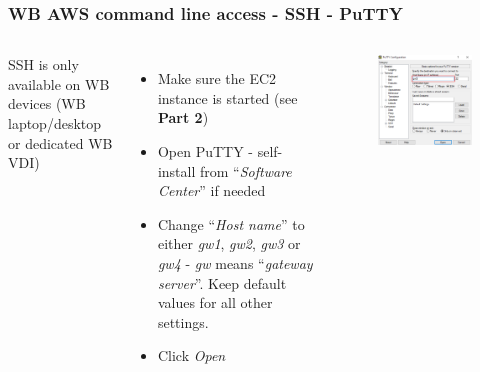 \documentclass[aspectratio=169]{beamer} %
\begin{document}
\begin{frame}
	\frametitle{WB AWS command line access - SSH - PuTTY}
	\begin{columns}[c]
		SSH is only available on WB devices
		(WB laptop/desktop or dedicated WB VDI)
		
		\vspace{.2cm}
		
		\begin{itemize}
			\item Make sure the EC2 instance is started
			(see \textbf{Part 2})
			\item Open PuTTY - self-install from 
			``\textit{Software Center}'' if needed
			\item Change ``\textit{Host name}''
			to either \textit{gw1}, \textit{gw2},
			\textit{gw3} or \textit{gw4}
			- \textit{gw} means ``\textit{gateway server}''. 
			Keep default values for all other settings.
			\item Click \textit{Open} 
		\end{itemize}

		\begin{figure}
			\centering
			\includegraphics[width=\textwidth]{./img/access-1.png}
		\end{figure}

	\end{columns}
\end{frame}
\end{document}
